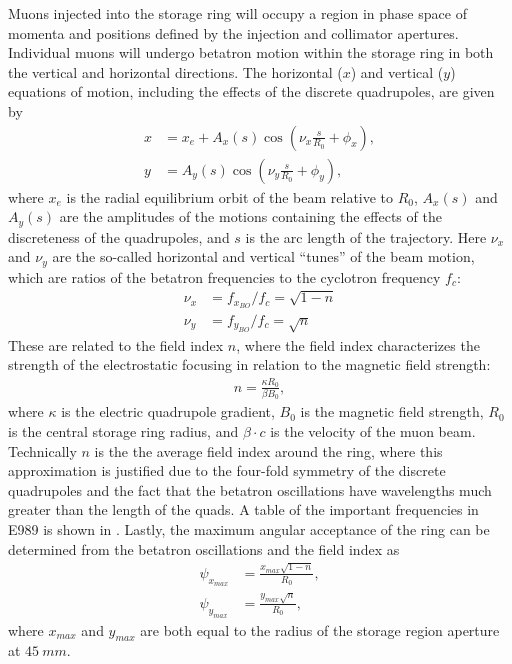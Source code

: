 Muons injected into the storage ring will occupy a region in phase space of momenta and positions defined by the injection and collimator apertures. Individual muons will undergo betatron motion within the storage ring in both the vertical and horizontal directions. The horizontal ($x$) and vertical ($y$) equations of motion, including the effects of the discrete quadrupoles, are given by
        \begin{align} \label{eq:betatronmotion}
            x &= x_{e} + A_{x}(s) \cos(\nu_{x} \frac{s}{R_{0}} + \phi_{x}), \\
            y &= A_{y}(s) \cos(\nu_{y} \frac{s}{R_{0}} + \phi_{y}), 
        \end{align}
where $x_{e}$ is the radial equilibrium orbit of the beam relative to $R_{0}$, $A_{x}(s)$ and $A_{y}(s)$ are the amplitudes of the motions containing the effects of the discreteness of the quadrupoles, and $s$ is the arc length of the trajectory. Here $\nu_{x}$ and $\nu_{y}$ are the so-called horizontal and vertical ``tunes'' of the beam motion, which are ratios of the betatron frequencies to the cyclotron frequency $f_{c}$: 
        \begin{equation} \label{eq:tunes}
        \begin{aligned}
            \nu_{x} &= f_{x_{BO}}/f_{c} = \sqrt{1-n} \\
            \nu_{y} &= f_{y_{BO}}/f_{c} = \sqrt{n}
        \end{aligned}
        \end{equation}
These are related to the field index $n$, where the field index characterizes the strength of the electrostatic focusing in relation to the magnetic field strength: 
        \begin{align} \label{eq:fieldindex}
            n = \frac{\kappa R_{0}}{\beta B_{0}},
        \end{align}
where $\kappa$ is the electric quadrupole gradient, $B_{0}$ is the magnetic field strength, $R_{0}$ is the central storage ring radius, and $\beta \cdot c$ is the velocity of the muon beam. Technically $n$ is the the average field index around the ring, where this approximation is justified due to the four-fold symmetry of the discrete quadrupoles and the fact that the betatron oscillations have wavelengths much greater than the length of the quads. A table of the important frequencies in E989 is shown in . Lastly, the maximum angular acceptance of the ring can be determined from the betatron oscillations and the field index as 
        \begin{equation} \label{eq:maxangles}
        \begin{aligned}
            \psi_{x_{max}} &= \frac{x_{max}\sqrt{1-n}}{R_{0}}, \\
            \psi_{y_{max}} &= \frac{y_{max}\sqrt{n}}{R_{0}},
        \end{aligned}
        \end{equation}
where $x_{max}$ and $y_{max}$ are both equal to the radius of the storage region aperture at $\SI{45}{mm}$.


